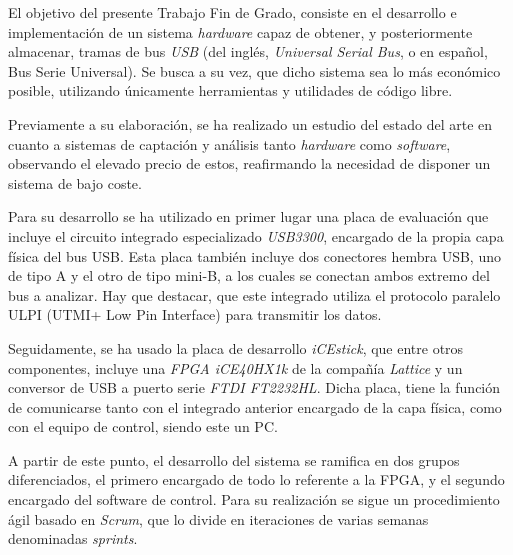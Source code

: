 \begin{resumen}

El objetivo del presente Trabajo Fin de Grado, consiste en el desarrollo e implementación de un sistema \emph{hardware} capaz de obtener, y posteriormente almacenar, tramas de bus \emph{USB} (del inglés, \emph{Universal Serial Bus}, o en español, Bus Serie Universal). Se busca a su vez, que dicho sistema sea lo más económico posible, utilizando únicamente herramientas y utilidades de código libre.

Previamente a su elaboración, se ha realizado un estudio del estado del arte en cuanto a sistemas de captación y análisis tanto \emph{hardware} como \emph{software}, observando el elevado precio de estos, reafirmando la necesidad de disponer un sistema de bajo coste.

Para su desarrollo se ha utilizado en primer lugar una placa de evaluación que incluye el circuito integrado especializado \emph{USB3300}, encargado de la propia capa física del bus USB. Esta placa también incluye dos conectores hembra USB, uno de tipo A y el otro de tipo mini-B, a los cuales se conectan ambos extremo del bus a analizar. Hay que destacar, que este integrado utiliza el protocolo paralelo ULPI (UTMI+ Low Pin Interface) para transmitir los datos.

Seguidamente, se ha usado la placa de desarrollo \emph{iCEstick}, que entre otros componentes, incluye una \emph{FPGA iCE40HX1k} de la compañía \emph{Lattice} y un conversor de USB a puerto serie \emph{FTDI FT2232HL}. Dicha placa, tiene la función de comunicarse tanto con el integrado anterior encargado de la capa física, como con el equipo de control, siendo este un PC.

A partir de este punto, el desarrollo del sistema se ramifica en dos grupos diferenciados, el primero encargado de todo lo referente a la FPGA, y el segundo encargado del software de control. Para su realización se sigue un procedimiento ágil basado en \emph{Scrum}, que lo divide en iteraciones de varias semanas denominadas \emph{sprints}.


\end{resumen}

